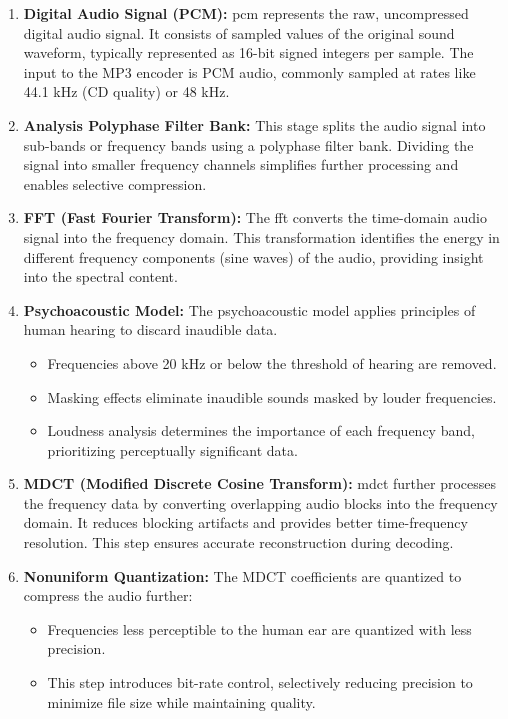 \documentclass{ioereport}
\begin{document}
        \begin{enumerate}[label=\textbf{\roman*.}]
            \item \textbf{Digital Audio Signal (PCM):}  
            \gls{pcm} represents the raw, uncompressed digital audio signal. It consists of sampled values of the original sound waveform, typically represented as 16-bit signed integers per sample. The input to the MP3 encoder is PCM audio, commonly sampled at rates like 44.1 kHz (CD quality) or 48 kHz.
        
            \item \textbf{Analysis Polyphase Filter Bank:}  
            This stage splits the audio signal into sub-bands or frequency bands using a polyphase filter bank. Dividing the signal into smaller frequency channels simplifies further processing and enables selective compression.
        
            \item \textbf{FFT (Fast Fourier Transform):}  
            The \gls{fft} converts the time-domain audio signal into the frequency domain. This transformation identifies the energy in different frequency components (sine waves) of the audio, providing insight into the spectral content.
        
            \item \textbf{Psychoacoustic Model:}  
            The psychoacoustic model applies principles of human hearing to discard inaudible data.
            \begin{itemize}
                \item Frequencies above 20 kHz or below the threshold of hearing are removed.
                \item Masking effects eliminate inaudible sounds masked by louder frequencies.
                \item Loudness analysis determines the importance of each frequency band, prioritizing perceptually significant data.
            \end{itemize}
        
            \item \textbf{MDCT (Modified Discrete Cosine Transform):}  
            \gls{mdct} further processes the frequency data by converting overlapping audio blocks into the frequency domain. It reduces blocking artifacts and provides better time-frequency resolution. This step ensures accurate reconstruction during decoding.
        
            \item \textbf{Nonuniform Quantization:}  
            The MDCT coefficients are quantized to compress the audio further:
            \begin{itemize}
                \item Frequencies less perceptible to the human ear are quantized with less precision.
                \item This step introduces bit-rate control, selectively reducing precision to minimize file size while maintaining quality.
            \end{itemize}
        

\end{enumerate}
\end{document}
